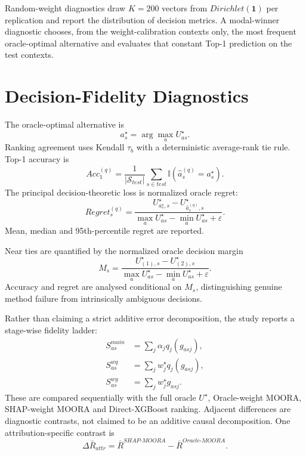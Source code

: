 \documentclass[runningheads]{llncs}
\newcommand{\I}{\mathbb{I}}
\newcommand{\eps}{\varepsilon}
\begin{document}
Random-weight diagnostics draw $K=200$ vectors from $Dirichlet(\mathbf1)$ per replication and
report the distribution of decision metrics. A modal-winner diagnostic chooses, from the
weight-calibration contexts only, the most frequent oracle-optimal alternative and evaluates
that constant Top-1 prediction on the test contexts.

\section{Decision-Fidelity Diagnostics}
\label{sec:decision}

The oracle-optimal alternative is
\begin{equation}
a_s^\star=\arg\max_aU_{as}^\star.
\label{eq:oraclechoice}
\end{equation}
Ranking agreement uses Kendall $\tau_b$ with a deterministic average-rank tie rule. Top-1
accuracy is
\begin{equation}
Acc_1^{(q)}
=\frac{1}{|\mathcal S_{test}|}
\sum_{s\in test}\I(\hat a_s^{(q)}=a_s^\star).
\label{eq:top1}
\end{equation}
The principal decision-theoretic loss is normalized oracle regret:
\begin{equation}
Regret_s^{(q)}
=
\frac{U_{a_s^\star,s}^\star-U_{\hat a_s^{(q)},s}^\star}
{\max_aU_{as}^\star-\min_aU_{as}^\star+\eps}.
\label{eq:regret}
\end{equation}
Mean, median and 95th-percentile regret are reported.

Near ties are quantified by the normalized oracle decision margin
\begin{equation}
M_s=
\frac{U_{(1),s}^\star-U_{(2),s}^\star}
{\max_aU_{as}^\star-\min_aU_{as}^\star+\eps}.
\label{eq:margin}
\end{equation}
Accuracy and regret are analysed conditional on $M_s$, distinguishing genuine method failure
from intrinsically ambiguous decisions.

Rather than claiming a strict additive error decomposition, the study reports a stage-wise
fidelity ladder:
\begin{align}
S_{as}^{main}&=\sum_j\alpha_jq_j(g_{asj}), \label{eq:stagemain}\\
S_{as}^{wq}&=\sum_jw_j^\star q_j(g_{asj}), \label{eq:stagewq}\\
S_{as}^{wg}&=\sum_jw_j^\star g_{asj}. \label{eq:stagewg}
\end{align}
These are compared sequentially with the full oracle $U^\star$, Oracle-weight MOORA,
SHAP-weight MOORA and Direct-XGBoost ranking. Adjacent differences are diagnostic contrasts,
not claimed to be an additive causal decomposition. One attribution-specific contrast is
\begin{equation}
\Delta\bar R_{attr}
=
\bar R^{SHAP\text{-}MOORA}-\bar R^{Oracle\text{-}MOORA}.
\label{eq:attrregret}
\end{equation}
\end{document}
